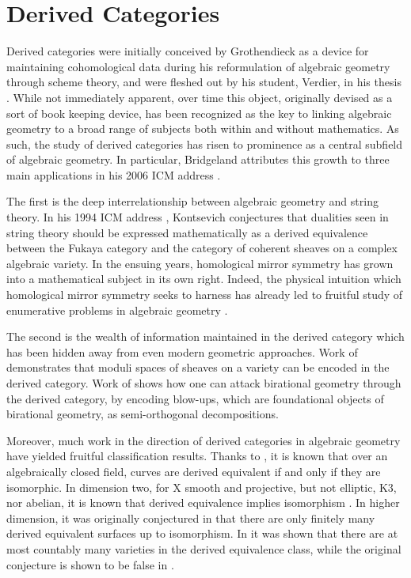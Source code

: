 \section*{Derived Categories}
Derived categories were initially conceived by Grothendieck as a device for maintaining cohomological data during his reformulation of algebraic geometry through scheme theory, and were fleshed out by his student, Verdier, in his thesis \parencite{Verdier}.
While not immediately apparent, over time this object, originally devised as a sort of book keeping device, has been recognized as the key to linking algebraic geometry to a broad range of subjects both within and without mathematics.
As such, the study of derived categories has risen to prominence as a central subfield of algebraic geometry.
In particular, Bridgeland attributes this growth to three main applications in his 2006 ICM address \parencite{Bridgeland06}.

The first is the deep interrelationship between algebraic geometry and string theory.
In his 1994 ICM address \parencite{Kontsevich95}, Kontsevich conjectures that dualities seen in string theory should be expressed mathematically as a derived equivalence between the Fukaya category and the category of coherent sheaves on a complex algebraic variety.
In the ensuing years, homological mirror symmetry has grown into a mathematical subject in its own right.
Indeed, the physical intuition which homological mirror symmetry seeks to harness has already led to fruitful study of enumerative problems in algebraic geometry \parencite{enumerative}.

The second is the wealth of information maintained in the derived category which has been hidden away from even modern geometric approaches.
Work of \textcite{Mukai81,Mukai87} demonstrates that moduli spaces of sheaves on a variety can be encoded in the derived category.
Work of \textcite{Bondal-Orlov} shows how one can attack birational geometry through the derived category, by encoding blow-ups, which are foundational objects of birational geometry, as semi-orthogonal decompositions.

Moreover, much work in the direction of derived categories in algebraic geometry have yielded fruitful classification results.
Thanks to \textcite{Orlov97}, it is known that over an algebraically closed field, curves are derived equivalent if and only if they are isomorphic.
In dimension two, for X smooth and projective, but not elliptic, K3, nor abelian, it is known that derived equivalence implies isomorphism \parencite[Prop. 12.1]{HuybrechtsFMT}.
In higher dimension, it was originally conjectured in \textcite{Kawamata02} that there are only finitely many derived equivalent surfaces up to isomorphism.
In \textcite{Anel-Toen09} it was shown that there are at most countably many varieties in the derived equivalence class, while the original conjecture is shown to be false in \textcite{Lesieutre15}.

